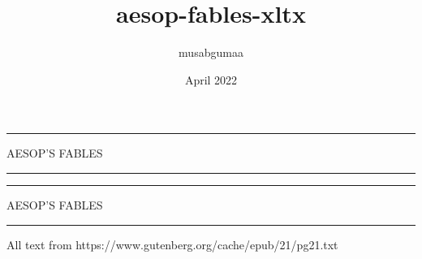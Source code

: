 \documentclass[a5paper, 11pt]{memoir}
\title{aesop-fables-xltx}
\author{musabgumaa}
\date{April 2022}
\begin{document}
{\pagecolor{black}
\color{white}
\pagestyle{empty}
\begin{vplace}
    \begin{center}
        \rule{\textwidth}{2pt}
        \smallskip

        \Huge AESOP'S FABLES
        
        \rule{\textwidth}{2pt}
    \end{center}
    \vspace{1in}
\end{vplace}
\clearpage
\pagecolor{white}
}

\frontmatter

\begin{vplace}
    \begin{center}
        \rule{\textwidth}{2pt}
        \smallskip

        \Huge AESOP'S FABLES
        
        \rule{\textwidth}{2pt}
        
        \vspace{2in}
        
        \small All text from https://www.gutenberg.org/cache/epub/21/pg21.txt
    \end{center}
\end{vplace}

\clearpage

\tableofcontents

\mainmatter

\pagecolor{white}
\end{document}
